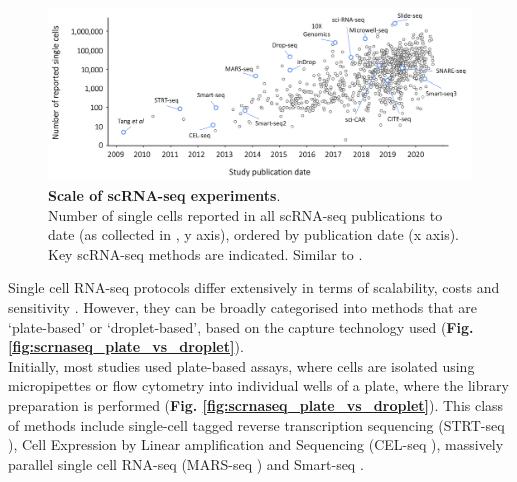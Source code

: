 \begin{figure}[h]
\centering
\includegraphics[width=16cm]{Chapter3/Fig/scrnaseq_ncells.png}
\caption[scRNA-seq technologies]{\textbf{Scale of scRNA-seq experiments}.\\
Number of single cells reported in all scRNA-seq publications to date (as collected in \cite{svensson2020single}, y axis), ordered by publication date (x axis).
Key scRNA-seq methods are indicated.
Similar to \cite{svensson2018exponential}.}
\label{fig:scrnaseq_technologies}
\end{figure}

Single cell RNA-seq protocols differ extensively in terms of scalability, costs and sensitivity 
\cite{ziegenhain2017comparative, svensson2018exponential}.
However, they can be broadly categorised into methods that are 
`plate-based' or `droplet-based', based on the capture technology used
(\textbf{Fig. \ref{fig:scrnaseq_plate_vs_droplet}}).\\

Initially, most studies used plate-based assays, where cells are isolated using micropipettes or flow cytometry into individual wells of a plate, where the library preparation is performed (\textbf{Fig. \ref{fig:scrnaseq_plate_vs_droplet}}).
This class of methods include single-cell tagged reverse transcription sequencing (STRT-seq \cite{islam2011characterization}), Cell Expression by Linear amplification and Sequencing (CEL-seq \cite{hashimshony2012cel}), massively parallel single cell RNA-seq (MARS-seq \cite{jaitin2014massively}) and Smart-seq \cite{ramskold2012full, picelli2013smart, hagemann2020single}. 
\\

